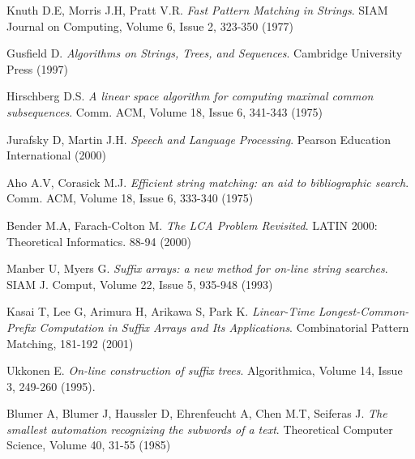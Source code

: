 
\begin{thebibliography}{99}

 Knuth D.E, Morris J.H, Pratt V.R. \textit{Fast Pattern Matching in Strings}. SIAM Journal on Computing, Volume 6, Issue 2, 323-350 (1977)

 Gusfield D. \textit{Algorithms on Strings, Trees, and Sequences}. Cambridge University Press (1997)

 Hirschberg D.S. \textit{A linear space algorithm for computing maximal common subsequences}. Comm. ACM, Volume 18, Issue 6, 341-343 (1975)

 Jurafsky D, Martin J.H. \textit{Speech and Language Processing}. Pearson Education International (2000)

 Aho A.V, Corasick M.J. \textit{Efficient string matching: an aid to bibliographic search}. Comm. ACM, Volume 18, Issue 6, 333-340 (1975)

 Bender M.A, Farach-Colton M. \textit{The LCA Problem Revisited}. LATIN 2000: Theoretical Informatics. 88-94 (2000)

 Manber U, Myers G. \textit{Suffix arrays: a new method for on-line string searches}. SIAM J. Comput, Volume 22, Issue 5, 935-948 (1993)

 Kasai T, Lee G, Arimura H, Arikawa S, Park K. \textit{Linear-Time Longest-Common-Prefix Computation in Suffix Arrays and Its Applications}. Combinatorial Pattern Matching, 181-192 (2001)

 Ukkonen E. \textit{On-line construction of suffix trees}. Algorithmica, Volume 14, Issue 3, 249-260 (1995). 

 Blumer A, Blumer J, Haussler D, Ehrenfeucht A, Chen M.T, Seiferas J. \textit{The smallest automation recognizing the subwords of a text}. Theoretical Computer Science,
Volume 40, 31-55 (1985)


\end{thebibliography}

